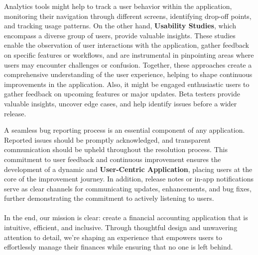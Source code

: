 Analytics tools might help to track a user behavior within the application, monitoring their navigation through 
different screens, identifying drop-off points, and tracking usage patterns. On the other hand, \textbf{Usability 
Studies}, which encompass a diverse group of users, provide valuable insights. These studies enable the observation of 
user interactions with the application, gather feedback on specific features or workflows, and are instrumental in 
pinpointing areas where users may encounter challenges or confusion. Together, these approaches create a comprehensive 
understanding of the user experience, helping to shape continuous improvements in the application. Also, it might be 
engaged enthusiastic users to gather feedback on upcoming features or major updates. Beta testers provide valuable 
insights, uncover edge cases, and help identify issues before a wider release.

A seamless bug reporting process is an essential component of any application. Reported issues should be promptly 
acknowledged, and transparent communication should be upheld throughout the resolution process. This commitment to 
user feedback and continuous improvement ensures the development of a dynamic and \textbf{User-Centric Application}, 
placing users at the core of the improvement journey. In addition, release notes or in-app notifications serve as clear 
channels for communicating updates, enhancements, and bug fixes, further demonstrating the commitment to actively 
listening to users.\\
\\

\noindent In the end, our mission is clear: create a financial accounting application that is intuitive, efficient, 
and inclusive. Through thoughtful design and unwavering attention to detail, we're shaping an experience that empowers 
users to effortlessly manage their finances while ensuring that no one is left behind.
